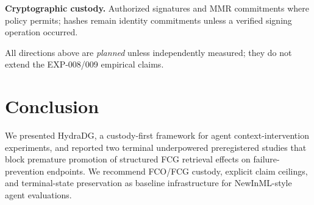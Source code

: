\documentclass{article}
\begin{document}
\textbf{Cryptographic custody.} Authorized signatures and MMR commitments where policy permits; hashes remain identity commitments unless a verified signing operation occurred.

All directions above are \emph{planned} unless independently measured; they do not extend the EXP-008/009 empirical claims.

\section{Conclusion}

We presented HydraDG, a custody-first framework for agent context-intervention experiments, and reported two terminal underpowered preregistered studies that block premature promotion of structured FCG retrieval effects on failure-prevention endpoints.
We recommend FCO/FCG custody, explicit claim ceilings, and terminal-state preservation as baseline infrastructure for NewInML-style agent evaluations.
\end{document}
